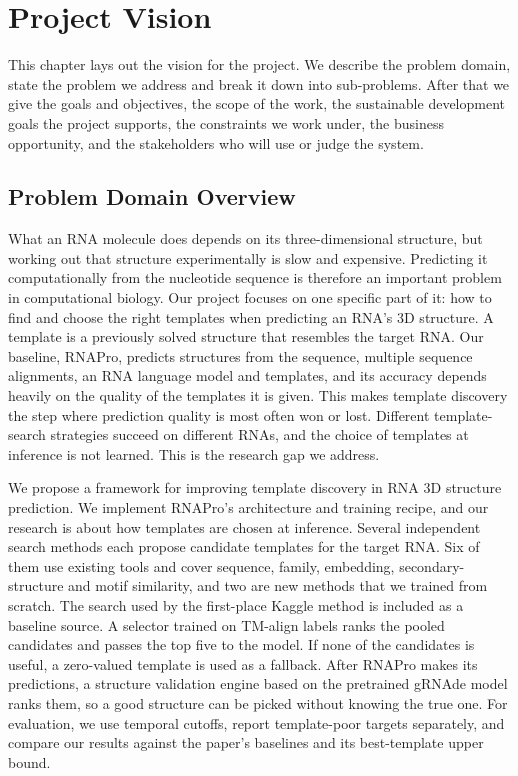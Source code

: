 \documentclass{FastFyp}
\begin{document}
\clearpage

\chapter{Project Vision}
\label{ch:vision}
This chapter lays out the vision for the project. We describe the problem domain, state the problem we address and break it down into sub-problems. After that we give the goals and objectives, the scope of the work, the sustainable development goals the project supports, the constraints we work under, the business opportunity, and the stakeholders who will use or judge the system.

\section{Problem Domain Overview}
What an RNA molecule does depends on its three-dimensional structure, but working out that structure experimentally is slow and expensive. Predicting it computationally from the nucleotide sequence is therefore an important problem in computational biology. Our project focuses on one specific part of it: how to find and choose the right templates when predicting an RNA's 3D structure. A template is a previously solved structure that resembles the target RNA. Our baseline, RNAPro, predicts structures from the sequence, multiple sequence alignments, an RNA language model and templates, and its accuracy depends heavily on the quality of the templates it is given. This makes template discovery the step where prediction quality is most often won or lost. Different template-search strategies succeed on different RNAs, and the choice of templates at inference is not learned. This is the research gap we address.

We propose a framework for improving template discovery in RNA 3D structure prediction. We implement RNAPro's architecture and training recipe, and our research is about how templates are chosen at inference. Several independent search methods each propose candidate templates for the target RNA. Six of them use existing tools and cover sequence, family, embedding, secondary-structure and motif similarity, and two are new methods that we trained from scratch. The search used by the first-place Kaggle method is included as a baseline source. A selector trained on TM-align labels ranks the pooled candidates and passes the top five to the model. If none of the candidates is useful, a zero-valued template is used as a fallback. After RNAPro makes its predictions, a structure validation engine based on the pretrained gRNAde model ranks them, so a good structure can be picked without knowing the true one. For evaluation, we use temporal cutoffs, report template-poor targets separately, and compare our results against the paper's baselines and its best-template upper bound.
\end{document}
